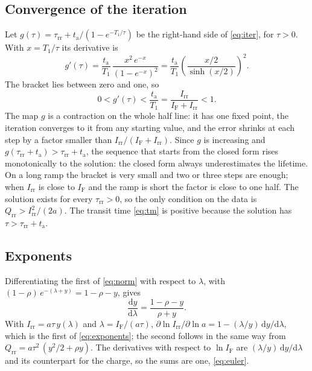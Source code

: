\documentclass[10pt,a4paper]{scrartcl}
\newcommand{\IF}{I_\mathrm{F}}
\newcommand{\Irr}{I_\mathrm{rr}}
\newcommand{\Qrr}{Q_\mathrm{rr}}
\newcommand{\ta}{t_\mathrm{a}}
\newcommand{\taurr}{\tau_\mathrm{rr}}
\newcommand{\Tone}{T_1}
\newcommand{\diff}{\mathrm{d}}
\begin{document}
\subsection{Convergence of the iteration}
\label{app:contraction}
Let $g(\tau) = \taurr + \ta/(1-e^{-\Tone/\tau})$ be the right-hand side of \eqref{eq:iter}, for $\tau > 0$. With $x = \Tone/\tau$ its derivative is
\begin{equation}
g'(\tau) = \frac{\ta}{\Tone}\,\frac{x^2\,e^{-x}}{(1-e^{-x})^2} = \frac{\ta}{\Tone}\left(\frac{x/2}{\sinh(x/2)}\right)^{2} .
\end{equation}
The bracket lies between zero and one, so
\begin{equation}
0 < g'(\tau) < \frac{\ta}{\Tone} = \frac{\Irr}{\IF+\Irr} < 1 .
\end{equation}
The map $g$ is a contraction on the whole half line: it has one fixed point, the iteration converges to it from any starting value, and the error shrinks at each step by a factor smaller than $\Irr/(\IF+\Irr)$. Since $g$ is increasing and $g(\taurr+\ta) > \taurr+\ta$, the sequence that starts from the closed form rises monotonically to the solution: the closed form always underestimates the lifetime. On a long ramp the bracket is very small and two or three steps are enough; when $\Irr$ is close to $\IF$ and the ramp is short the factor is close to one half. The solution exists for every $\taurr > 0$, so the only condition on the data is $\Qrr > \Irr^2/(2a)$. The transit time \eqref{eq:tm} is positive because the solution has $\tau > \taurr + \ta$.

\subsection{Exponents}
\label{app:exponents}
Differentiating the first of \eqref{eq:norm} with respect to $\lambda$, with $(1-\rho)\,e^{-(\lambda+y)} = 1-\rho-y$, gives
\begin{equation}
\frac{\diff y}{\diff\lambda} = \frac{1-\rho-y}{\rho+y} .
\end{equation}
With $\Irr = a\tau\,y(\lambda)$ and $\lambda = \IF/(a\tau)$, $\partial\ln\Irr/\partial\ln a = 1 - (\lambda/y)\,\diff y/\diff\lambda$, which is the first of \eqref{eq:exponents}; the second follows in the same way from $\Qrr = a\tau^2\,(y^2/2+\rho y)$. The derivatives with respect to $\ln\IF$ are $(\lambda/y)\,\diff y/\diff\lambda$ and its counterpart for the charge, so the sums are one, \eqref{eq:euler}.

\end{document}
